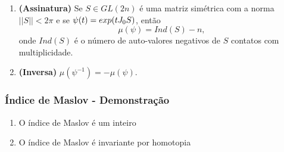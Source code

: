 \documentclass{beamer}
\begin{document}
\begin{footnotesize}
\begin{frame}
\begin{teorema}
\begin{enumerate}
					\item \textbf{(Assinatura)}\label{item_assinatura_maslov} Se $S \in GL(2n)$ é uma matriz simétrica com a norma $||S|| < 2\pi$ e se $\psi(t) = exp(tJ_{0} S)$, então 
					$$
					\mu(\psi) = Ind(S) - n,
					$$
					onde $Ind(S)$ é o número de auto-valores negativos de $S$ contatos com multiplicidade.
					
					\item \textbf{(Inversa)} $\mu(\psi^{-1}) = -\mu(\psi)$.
					
				\end{enumerate}
			\end{teorema}
	\end{frame}
	
	
	\begin{frame}
		\frametitle{Índice de Maslov - Demonstração}
		\begin{prova}
			\begin{enumerate}
				\item  O índice de Maslov é um inteiro
				
				\begin{itemize}
					
				\end{itemize}
				
				\item O índice de Maslov é invariante por homotopia 
				

\end{enumerate}
\end{prova}
\end{frame}
\end{footnotesize}
\end{document}

